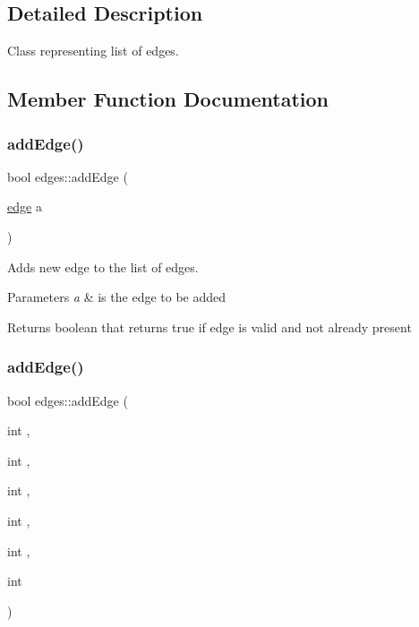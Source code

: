 \subsection{Detailed Description}
Class representing list of edges. 

\subsection{Member Function Documentation}
\mbox{\label{classedges_aa56e470241cdde31f4d4ac013c9e872e}} 
\subsubsection{\texorpdfstring{add\+Edge()}{addEdge()}\hspace{0.1cm}{\footnotesize\ttfamily [1/2]}}
{\footnotesize\ttfamily bool edges\+::add\+Edge (\begin{DoxyParamCaption}\item[{\mbox{\hyperlink{structedge}{edge}}}]{a }\end{DoxyParamCaption})}



Adds new edge to the list of edges. 


\begin{DoxyParams}{Parameters}
{\em a} & is the edge to be added \\
\hline
\end{DoxyParams}
\begin{DoxyReturn}{Returns}
boolean that returns true if edge is valid and not already present 
\end{DoxyReturn}
\mbox{\label{classedges_a119439409099b29e22dc66cf279a0ac0}} 
\subsubsection{\texorpdfstring{add\+Edge()}{addEdge()}\hspace{0.1cm}{\footnotesize\ttfamily [2/2]}}
{\footnotesize\ttfamily bool edges\+::add\+Edge (\begin{DoxyParamCaption}\item[{int}]{,  }\item[{int}]{,  }\item[{int}]{,  }\item[{int}]{,  }\item[{int}]{,  }\item[{int}]{ }\end{DoxyParamCaption})}

